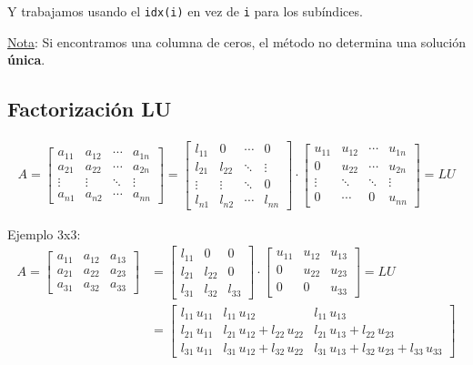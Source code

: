\documentclass[10pt,a4paper]{article}
\begin{document}
Y trabajamos usando el \texttt{idx(i)} en vez de \texttt{i} para los subíndices.

\small{\underline{Nota}: Si encontramos una columna de ceros, el método no determina una solución \textbf{única}.}

\subsection{Factorización LU}

\begin{align*}
A = \begin{bmatrix}
a_{11} & a_{12} & \cdots & a_{1n} \\
a_{21} & a_{22} & \cdots & a_{2n} \\
\vdots & \vdots & \ddots & \vdots \\
a_{n1} & a_{n2} & \cdots & a_{nn} 
\end{bmatrix} =
\begin{bmatrix}
l_{11} & 0 & \cdots & 0 \\
l_{21} & l_{22} & \ddots & \vdots \\
\vdots & \vdots & \ddots & 0 \\
l_{n1} & l_{n2} & \cdots & l_{nn}
\end{bmatrix}
\cdot
\begin{bmatrix}
u_{11} & u_{12} & \cdots & u_{1n} \\
0 & u_{22} & \cdots & u_{2n} \\
\vdots & \ddots & \ddots & \vdots \\
0 & \cdots & 0 & u_{nn} 
\end{bmatrix} = LU
\end{align*}

Ejemplo 3x3:
\begin{align*}
A=\begin{bmatrix}
a_{11} & a_{12} & a_{13} \\
a_{21} & a_{22} & a_{23} \\
a_{31} & a_{32} & a_{33} 
\end{bmatrix} &=
\begin{bmatrix}
l_{11} & 0 & 0 \\
l_{21} & l_{22} & 0 \\
l_{31} & l_{32} & l_{33} 
\end{bmatrix}
\cdot
\begin{bmatrix}
u_{11} & u_{12} & u_{13} \\
0 & u_{22} & u_{23} \\
0 & 0 & u_{33} 
\end{bmatrix} =LU \\ &=
\begin{bmatrix}
l_{11} \, u_{11} & l_{11} \, u_{12} & l_{11} \, u_{13} \\
l_{21} \, u_{11} & l_{21} \, u_{12} + l_{22} \, u_{22} & l_{21} \, u_{13} + l_{22} \, u_{23}\\
l_{31} \, u_{11} 
& l_{31} \, u_{12} + l_{32} \, u_{22}
& l_{31} \, u_{13} + l_{32} \, u_{23} + l_{33} \, u_{33}
\end{bmatrix}
\end{align*}
\end{document}
